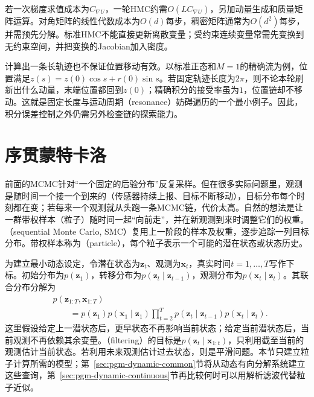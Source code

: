 若一次梯度求值成本为$C_{\nabla U}$，一轮HMC约需$O(L C_{\nabla U})$，另加动量生成和质量矩阵运算。对角矩阵的线性代数成本为$O(d)$每步，稠密矩阵通常为$O(d^2)$每步，并需预先分解。标准HMC不能直接更新离散变量；受约束连续变量常需先变换到无约束空间，并把变换的Jacobian加入密度。

计算出一条长轨迹也不保证位置移动有效。以标准正态和$M=1$的精确流为例，位置满足$z(s)=z(0)\cos s+r(0)\sin s$。若固定轨迹长度为$2\pi$，则不论本轮刷新出什么动量，末端位置都回到$z(0)$；精确积分的接受率虽为$1$，位置链却不移动。这就是固定长度与运动周期（resonance）妨碍遍历的一个最小例子。因此，积分误差控制之外仍需另外检查链的探索能力。

\section{序贯蒙特卡洛}
\label{sec:pgm-sampling-smc}

前面的MCMC针对“一个固定的后验分布”反复采样。但在很多实际问题里，观测是随时间一个接一个到来的（传感器持续上报、目标不断移动），目标分布每个时刻都在变；若每来一个观测就从头跑一条MCMC链，代价太高。自然的想法是让一群带权样本（粒子）随时间一起“向前走”，并在新观测到来时调整它们的权重。（sequential Monte Carlo, SMC）复用上一阶段的样本及权重，逐步追踪一列目标分布。带权样本称为（particle），每个粒子表示一个可能的潜在状态或状态历史。

为建立最小动态设定，令潜在状态为$\bm{z}_t$、观测为$\bm{x}_t$，真实时间$t=1,\ldots,T$写作下标。初始分布为$p(\bm{z}_1)$，转移分布为$p(\bm{z}_t\mid\bm{z}_{t-1})$，观测分布为$p(\bm{x}_t\mid\bm{z}_t)$。其联合分布分解为
\begin{equation}
  \begin{aligned}
    &p(\bm{z}_{1:T},\bm{x}_{1:T})\\
    &\qquad=p(\bm{z}_1)p(\bm{x}_1\mid\bm{z}_1)
       \prod_{t=2}^{T}
         p(\bm{z}_t\mid\bm{z}_{t-1})p(\bm{x}_t\mid\bm{z}_t).
  \end{aligned}
  \label{eq:pgm-sampling-state-space}
\end{equation}
这里假设给定上一潜状态后，更早状态不再影响当前状态；给定当前潜状态后，当前观测不再依赖其余变量。（filtering）的目标是$p(\bm{z}_t\mid\bm{x}_{1:t})$，只利用截至当前的观测估计当前状态。若利用未来观测估计过去状态，则是平滑问题。本节只建立粒子计算所需的模型；第~\ref{sec:pgm-dynamic-common}节将从动态有向分解系统建立这些查询，第~\ref{sec:pgm-dynamic-continuous}节再比较何时可以用解析滤波代替粒子近似。

